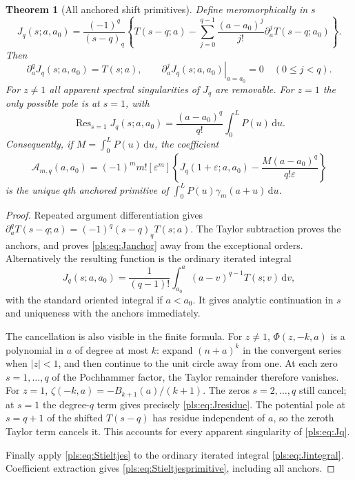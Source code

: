 \documentclass[11pt,letterpaper]{article}
\numberwithin{equation}{section}
\newtheorem{theorem}{Theorem}[section]
\theoremstyle{definition}
\theoremstyle{remark}\newtheorem{remark}[theorem]{Remark}
\newcommand{\dd}{\,\mathrm d}
\newcommand{\Res}{\operatorname{Res}}
\begin{document}
\begin{theorem}[All anchored shift primitives]
\label{pls:thm:primitives}
Define meromorphically in $s$
\begin{equation}\label{pls:eq:Jq}
 J_q(s;a,a_0)=\frac{(-1)^q}{(s-q)_q}
 \left\{T(s-q;a)-\sum_{j=0}^{q-1}\frac{(a-a_0)^j}{j!}
                              \partial_a^jT(s-q;a_0)\right\}.
\end{equation}
Then
\begin{equation}\label{pls:eq:Janchor}
 \partial_a^qJ_q(s;a,a_0)=T(s;a),\qquad
 \left.\partial_a^jJ_q(s;a,a_0)\right|_{a=a_0}=0
                              \quad(0\le j<q).
\end{equation}
For $z\ne1$ all apparent spectral singularities of $J_q$ are
removable. For $z=1$ the only possible pole is at $s=1$, with
\begin{equation}\label{pls:eq:Jresidue}
 \Res_{s=1}J_q(s;a,a_0)
     =\frac{(a-a_0)^q}{q!}\int_0^L P(u)\dd u.
\end{equation}
Consequently, if $M=\int_0^LP(u)\dd u$, the coefficient
\begin{equation}\label{pls:eq:Stieltjesprimitive}
 \mathcal A_{m,q}(a,a_0)=(-1)^m m![\varepsilon^m]
 \left\{J_q(1+\varepsilon;a,a_0)
                  -\frac{M(a-a_0)^q}{q!\varepsilon}\right\}
\end{equation}
is the unique $q$th anchored primitive of
$\int_0^LP(u)\gamma_m(a+u)\dd u$.
\end{theorem}
\begin{proof}
Repeated argument differentiation gives
$\partial_a^qT(s-q;a)=(-1)^q(s-q)_qT(s;a)$.
The Taylor subtraction proves the anchors, and proves
\eqref{pls:eq:Janchor} away from the exceptional orders.
Alternatively the resulting function is the ordinary iterated integral
\begin{equation}\label{pls:eq:Jintegral}
 J_q(s;a,a_0)=\frac1{(q-1)!}\int_{a_0}^{a}
                           (a-v)^{q-1}T(s;v)\dd v,
\end{equation}
with the standard oriented integral if $a<a_0$. It gives analytic
continuation in $s$ and uniqueness with the anchors immediately.

The cancellation is also visible in the finite formula. For $z\ne1$,
$\Phi(z,-k,a)$ is a polynomial in $a$ of degree at most $k$:
expand $(n+a)^k$ in the convergent series when $|z|<1$, and then
continue to the unit circle away from one. At each zero
$s=1,\ldots,q$ of the Pochhammer factor, the Taylor remainder
therefore vanishes. For $z=1$, $\zeta(-k,a)=-B_{k+1}(a)/(k+1)$.
The zeros $s=2,\ldots,q$ still cancel; at $s=1$ the degree-$q$
term gives precisely \eqref{pls:eq:Jresidue}. The potential pole
at $s=q+1$ of the shifted $T(s-q)$ has residue independent of $a$,
so the zeroth Taylor term cancels it. This accounts for every apparent
singularity of \eqref{pls:eq:Jq}.

Finally apply \eqref{pls:eq:Stieltjes} to the ordinary iterated
integral \eqref{pls:eq:Jintegral}. Coefficient extraction gives
\eqref{pls:eq:Stieltjesprimitive}, including all anchors.
\end{proof}
\end{document}
